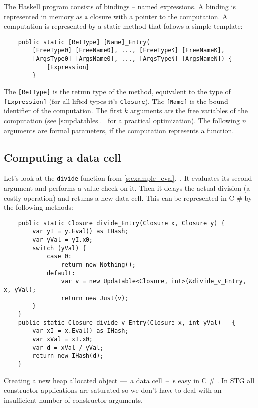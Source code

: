 \documentclass[en]{pracamgr}
\newcommand{\shrp}{%
  {\fontfamily{ppl}\selectfont\#%
  }}
\newcommand{\myref}[1]{\ref{#1}.~\textit{\nameref{#1}}}
\begin{document}
The Haskell program consists of bindings -- named expressions.
A binding is represented in memory as a closure with a pointer to the computation.
A computation is represented by a static method that follows a simple template:

\begin{verbatim}
    public static [RetType] [Name]_Entry(
        [FreeType0] [FreeName0], ..., [FreeTypeK] [FreeNameK],
        [ArgsType0] [ArgsName0], ..., [ArgsTypeN] [ArgsNameN]) {
            [Expression]
        }
\end{verbatim}

The \verb|[RetType]| is the return type of the method,
equivalent to the type of \verb|[Expression]|
(for all lifted types it's \texttt{Closure}).
The \verb|[Name]| is the bound identifier of the computation.
The first $k$ arguments are the free variables of the computation
(see \myref{s:updatables} for a practical optimization).
The following $n$ arguments are formal parameters, if the computation represents a function.

\subsection{Computing a data cell}\label{s:compute_data}

Let's look at the \texttt{divide} function from \myref{s:example_eval}.
It evaluates its second argument and performs a value check on it.
Then it delays the actual division (a costly operation) and returns a new data cell.
This can be represented in C\shrp{} by the following methods:

\begin{verbatim}
    public static Closure divide_Entry(Closure x, Closure y) {
        var yI = y.Eval() as IHash;
        var yVal = yI.x0;
        switch (yVal) {
            case 0:
                return new Nothing();
            default:
                var v = new Updatable<Closure, int>(&divide_v_Entry, x, yVal);
                return new Just(v);
        }
    }
    public static Closure divide_v_Entry(Closure x, int yVal)   {
        var xI = x.Eval() as IHash;
        var xVal = xI.x0;
        var d = xVal / yVal;
        return new IHash(d);
    }
\end{verbatim}

Creating a new heap allocated object ––~a data cell~--
is easy in C\shrp{}. In STG all constructor applications are
saturated so we don't have to deal with an
insufficient number of constructor arguments.
\end{document}

